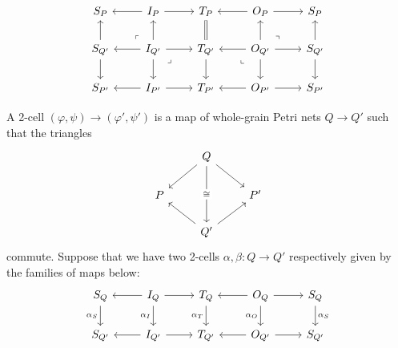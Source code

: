 \documentclass[11pt,a4paper]{article}
\theoremstyle{plain}
\theoremstyle{definition}
\theoremstyle{remark}
\begin{document}
\[\begin{tikzcd}
	{S_P} & {I_P} & {T_P} & {O_P} & {S_P} \\
	{S_{Q'}} & {I_{Q'}} & {T_{Q'}} & {O_{Q'}} & {S_{Q'}} \\
	{S_{P'}} & {I_{P'}} & {T_{P'}} & {O_{P'}} & {S_{P'}}
	\arrow[from=1-2, to=1-1]
	\arrow[from=1-2, to=1-3]
	\arrow[from=1-4, to=1-3]
	\arrow[from=1-4, to=1-5]
	\arrow[from=2-1, to=1-1]
	\arrow[from=2-1, to=3-1]
	\arrow["\lrcorner"{anchor=center, pos=0.125, rotate=180}, draw=none, from=2-2, to=1-1]
	\arrow[from=2-2, to=1-2]
	\arrow[from=2-2, to=2-1]
	\arrow[from=2-2, to=2-3]
	\arrow[from=2-2, to=3-2]
	\arrow["\lrcorner"{anchor=center, pos=0.125}, draw=none, from=2-2, to=3-3]
	\arrow[equals, from=2-3, to=1-3]
	\arrow[from=2-3, to=3-3]
	\arrow[from=2-4, to=1-4]
	\arrow["\lrcorner"{anchor=center, pos=0.125, rotate=90}, draw=none, from=2-4, to=1-5]
	\arrow[from=2-4, to=2-3]
	\arrow[from=2-4, to=2-5]
	\arrow["\lrcorner"{anchor=center, pos=0.125, rotate=-90}, draw=none, from=2-4, to=3-3]
	\arrow[from=2-4, to=3-4]
	\arrow[from=2-5, to=1-5]
	\arrow[from=2-5, to=3-5]
	\arrow[from=3-2, to=3-1]
	\arrow[from=3-2, to=3-3]
	\arrow[from=3-4, to=3-3]
	\arrow[from=3-4, to=3-5]
\end{tikzcd}\]

A 2-cell $(\varphi, \psi) \to (\varphi', \psi')$ is a map of whole-grain Petri nets $Q \to Q'$ such that the triangles
\[\begin{tikzcd}
	& Q \\
	P && {P'} \\
	& {Q'}
	\arrow[from=1-2, to=2-1]
	\arrow[from=1-2, to=2-3]
	\arrow["\cong"{description}, from=1-2, to=3-2]
	\arrow[from=3-2, to=2-1]
	\arrow[from=3-2, to=2-3]
\end{tikzcd}\]
commute. Suppose that we have two 2-cells $\alpha, \beta : Q \to Q'$ respectively given by the families of maps below:
\[\begin{tikzcd}
	{S_Q} & {I_Q} & {T_Q} & {O_Q} & {S_Q} \\
	{S_{Q'}} & {I_{Q'}} & {T_{Q'}} & {O_{Q'}} & {S_{Q'}}
	\arrow["\alpha_S"', from=1-1, to=2-1]
	\arrow[from=1-2, to=1-1]
	\arrow[from=1-2, to=1-3]
	\arrow["\alpha_I"', from=1-2, to=2-2]
	\arrow["\alpha_T"', from=1-3, to=2-3]
	\arrow[from=1-4, to=1-3]
	\arrow[from=1-4, to=1-5]
	\arrow["\alpha_O"', from=1-4, to=2-4]
	\arrow["\alpha_S", from=1-5, to=2-5]
	\arrow[from=2-2, to=2-1]
	\arrow[from=2-2, to=2-3]
	\arrow[from=2-4, to=2-3]
	\arrow[from=2-4, to=2-5]
\end{tikzcd}\]
\end{document}
